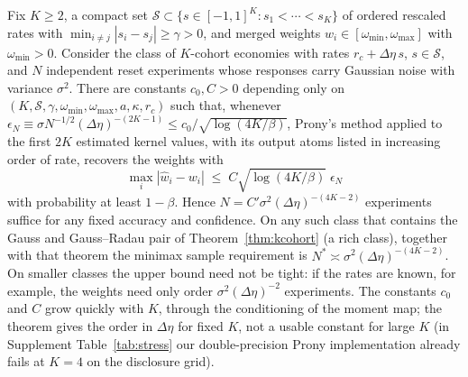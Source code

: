 \begin{theorem}\label{prop:esprit}
Fix $K\ge2$, a compact set $\mathcal S\subset\{s\in[-1,1]^K:s_1<\cdots<s_K\}$ of ordered rescaled rates with $\min_{i\ne j}|s_i-s_j|\ge\gamma>0$, and merged weights $w_i\in[\omega_{\min},\omega_{\max}]$ with $\omega_{\min}>0$. Consider the class of $K$-cohort economies with rates $r_c+\Delta\eta\,s$, $s\in\mathcal S$, and $N$ independent reset experiments whose responses carry Gaussian noise with variance $\sigma^2$. There are constants $c_0,C>0$ depending only on $(K,\mathcal S,\gamma,\omega_{\min},\omega_{\max},a,\kappa,r_c)$ such that, whenever $\epsilon_N\equiv\sigma N^{-1/2}(\Delta\eta)^{-(2K-1)}\le c_0/\sqrt{\log(4K/\beta)}$, Prony's method applied to the first $2K$ estimated kernel values, with its output atoms listed in increasing order of rate, recovers the weights with
\[
\max_i|\hat w_i-w_i|\;\le\;C\sqrt{\log(4K/\beta)}\;\epsilon_N
\]
with probability at least $1-\beta$. Hence $N=C'\sigma^2(\Delta\eta)^{-(4K-2)}$ experiments suffice for any fixed accuracy and confidence. On any such class that contains the Gauss and Gauss--Radau pair of Theorem~\ref{thm:kcohort} (a rich class), together with that theorem the minimax sample requirement is $N^*\asymp\sigma^2(\Delta\eta)^{-(4K-2)}$. On smaller classes the upper bound need not be tight: if the rates are known, for example, the weights need only order $\sigma^2(\Delta\eta)^{-2}$ experiments. The constants $c_0$ and $C$ grow quickly with $K$, through the conditioning of the moment map; the theorem gives the order in $\Delta\eta$ for fixed $K$, not a usable constant for large $K$ (in Supplement Table~\ref{tab:stress} our double-precision Prony implementation already fails at $K=4$ on the disclosure grid).
\end{theorem}

